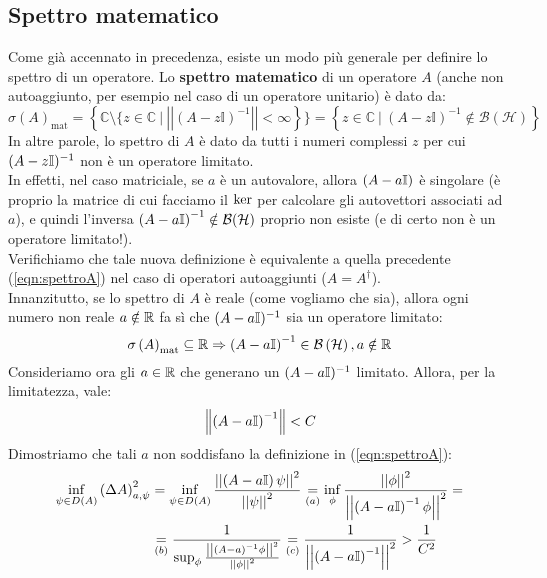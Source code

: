 \documentclass[../../FisicaTeorica.tex]{subfiles}
\begin{document}
\subsection{Spettro matematico}
\begin{comment}
Abbiamo definito lo spettro di un'osservabile $O$ descritta dall'operatore $A$ come:
\begin{equation}
\sigma \left(A\right)= \left\{a\in\mathbb{R}\ |\inf_{\psi\in D\left(A\right)}{\left(\Delta A\right)_{a,\psi}=0}\right\}
\label{eqn:spettroA}
\end{equation}
\end{comment}
Come già accennato in precedenza, esiste un modo più generale per definire lo spettro di un operatore. Lo \textbf{spettro matematico} di un operatore $A$ (anche non autoaggiunto, per esempio nel caso di un operatore unitario) è dato da:
\[
\sigma \left(A\right)_{\text{mat}}= \left\{\mathbb{C}\setminus \{ z\in\mathbb{C}\ |\ \left|\left|\left(A-z\mathbb{I}\right)^{-1}\right|\right|<\infty\right\}\}
=\left\{z\in\mathbb{C}\ |\
\left(A-z\mathbb{I}\right)^{-1}\notin\mathcal{B}(\mathcal{H})\right\}
\]
In altre parole, lo spettro di $A$ è dato da tutti i numeri complessi $z$ per cui $(A-z\mathbb{I})^{-1}$ non è un operatore limitato.\\
In effetti, nel caso matriciale, se $a$ è un autovalore, allora $(A-a\mathbb{I})$ è singolare (è proprio la matrice di cui facciamo il $\operatorname{ker}$ per calcolare gli autovettori associati ad $a$), e quindi l'inversa $\left(A-a\mathbb{I}\right)^{-1}\notin \mathcal{B}(\mathcal{H})$ proprio non esiste (e di certo non è un operatore limitato!).\\
Verifichiamo che tale nuova definizione è equivalente a quella precedente (\ref{eqn:spettroA}) nel caso di operatori autoaggiunti ($A=A^\dag$).\\
Innanzitutto, se lo spettro di $A$ è reale (come vogliamo che sia), allora ogni numero non reale $a\notin \mathbb{R}$ fa sì che $(A-a\mathbb{I})^{-1}$ sia un operatore limitato:
\[ \sigma \left(A\right)_{\text{mat}}\subseteq \mathbb{R} \Rightarrow \left(A-a\mathbb{I}\right)^{-1}\in \mathcal{B}\left(\mathcal{H}\right), a\notin \mathbb{R} 
\]
Consideriamo ora gli $a\in \mathbb{R}$ che generano un $(A-a\mathbb{I})^{-1}$ limitato. Allora, per la limitatezza, vale:
\[
\left\lVert\left(A-a\mathbb{I}\right)^{-1}\right\rVert<C
\]
Dimostriamo che tali $a$ non soddisfano la definizione in (\ref{eqn:spettroA}):
\begin{align*}
\inf_{\psi\in D\left(A\right)}{\left(\Delta A\right)_{a,\psi}^2}
&=\inf_{\psi\in D\left(A\right)}{\frac{\left|\left|\left(A-a\mathbb{I}\right)\psi\right|\right|^2}{\left|\left|\psi\right|\right|^2}}
\underset{(a)}{=}\inf_\phi{\frac{\left|\left|\phi\right|\right|^2}{\left|\left|\left(A-a\mathbb{I}\right)^{-1}\phi\right|\right|^2}}=\\
&\underset{(b)}{=}\frac{1}{\sup_\phi{\frac{\left|\left|\left(A-a\right)^{-1}\phi\right|\right|^2}{\left|\left|\phi\right|\right|^2}}}\underset{(c)}{=}\frac{1}{\left|\left|\left(A-a\mathbb{I}\right)^{-1}\right|\right|^2}>\frac{1}{C^2}
\end{align*}
\end{document}
